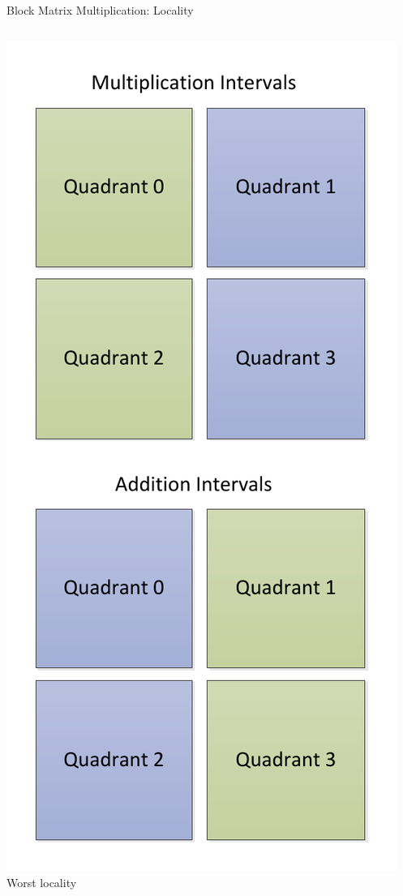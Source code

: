 \begin{frame}{Block Matrix Multiplication: Locality}
\begin{columns}[c]
\begin{column}{0.31\textwidth}
\begin{center}
        \includegraphics[width=\linewidth]{figures/matmult-worst-locality} \\
        \tiny{Worst locality}
      \end{center}
    \end{column}
  \end{columns}
\end{frame}

